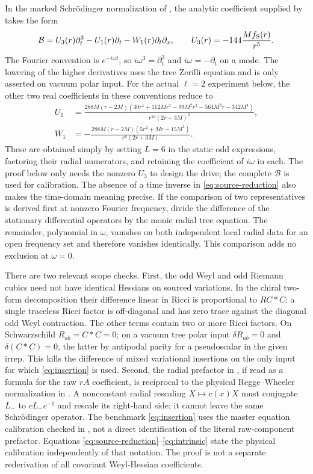 \documentclass[11pt]{article}
\begin{document}
In the marked Schr\"odinger normalization of \cite{P27}, the analytic coefficient supplied by \cite[App.~C, Eqs.~(C17),(C19)]{Cano} takes the form
\begin{equation}\label{eq:insertion}
 \mathcal B=U_3(r)\partial_t^3-U_1(r)\partial_t-W_1(r)\partial_t\partial_x,
 \qquad U_3(r)=-144\frac{M f_{\rm S}(r)}{r^5}.
\end{equation}
The Fourier convention is $e^{-i\omega t}$, so $i\omega^3=\partial_t^3$ and $i\omega=-\partial_t$ on a mode. The lowering of the higher derivatives uses the tree Zerilli equation and is only asserted on vacuum polar input. For the actual $\ell=2$ experiment below, the other two real coefficients in these conventions reduce to
\begin{align}
 U_1&=\frac{288M(r-2M)(30r^4+112Mr^3-99M^2r^2-564M^3r-342M^4)}{r^{10}(2r+3M)^2},\nonumber\\
 W_1&=-\frac{288M(r-2M)(5r^2+Mr-15M^2)}{r^8(2r+3M)}.                       \label{eq:ell2}
\end{align}
These are obtained simply by setting $L=6$ in the static odd expressions, factoring their radial numerators, and retaining the coefficient of $i\omega$ in each. The proof below only needs the nonzero $U_3$ to design the drive; the complete $\mathcal B$ is used for calibration. The absence of a time inverse in \eqref{eq:source-reduction} also makes the time-domain meaning precise. If the comparison of two representatives is derived first at nonzero Fourier frequency, divide the difference of the stationary differential operators by the monic radial tree equation. The remainder, polynomial in $\omega$, vanishes on both independent local radial data for an open frequency set and therefore vanishes identically. This comparison adds no exclusion at $\omega=0$.

There are two relevant scope checks. First, the odd Weyl and odd Riemann cubics need not have identical Hessians on sourced variations. In the chiral two-form decomposition their difference linear in Ricci is proportional to $R C{*}C$: a single traceless Ricci factor is off-diagonal and has zero trace against the diagonal odd Weyl contraction. The other terms contain two or more Ricci factors. On Schwarzschild $R_{ab}=C{*}C=0$; on a vacuum tree polar input $\delta R_{ab}=0$ and $\delta(C{*}C)=0$, the latter by antipodal parity for a pseudoscalar in the given irrep. This kills the difference of mixed variational insertions on the only input for which \eqref{eq:insertion} is used. Second, the radial prefactor in \cite[Eq.~(40)]{Cano}, if read as a formula for the raw $rA$ coefficient, is reciprocal to the physical Regge--Wheeler normalization in \cite{MartelPoisson}. A nonconstant radial rescaling $X\mapsto c(x)X$ must conjugate $L_-$ to $cL_-c^{-1}$ and rescale its right-hand side; it cannot leave the same Schr\"odinger operator. The benchmark \eqref{eq:insertion} uses the master equation calibration checked in \cite{P27}, not a direct identification of the literal raw-component prefactor. Equations \eqref{eq:source-reduction}--\eqref{eq:intrinsic} state the physical calibration independently of that notation. The proof is not a separate rederivation of all covariant Weyl-Hessian coefficients.
\end{document}

